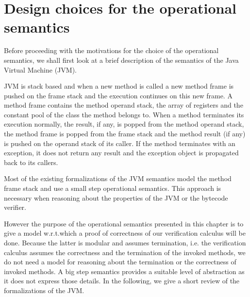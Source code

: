 
\section{Design choices for the operational semantics}\label{opSem:JVM}


 Before proceeding with the motivations for the choice of the operational semantics,
 we shall first look at a brief description of the semantics of the Java Virtual Machine (JVM).

 JVM is stack based and when a new method is called a new method frame is pushed on the frame stack and the execution continues on this new frame.
 A method frame contains the method operand stack, the array of registers and the constant pool of the class the method belongs to.
 When a method terminates its execution normally, the result, if any, is popped from the method operand stack, the method frame is
 popped from the frame stack and the method result (if any) is pushed on the operand stack
 of its caller. If the method terminates with an exception, it does not return any result and the exception object is propagated back to its callers.


 Most of the existing formalizations of the JVM semantics model the method frame stack and use a small step operational semantics. 
 This approach is necessary when reasoning about the properties of the JVM or the bytecode verifier. 

 However the purpose of the operational semantics presented in this chapter is to give
 a model w.r.t.which a proof of correctness of our verification calculus will be done. Because the latter
 is modular and assumes termination,
 i.e. the verification calculus assumes the correctness and the termination of the invoked methods,
 we do not need a model for reasoning about the termination or the correctness of invoked methods.
 A big step semantics provides a suitable level of abstraction as it does not express those details.
 In the following, we give a short review of the formalizations of the JVM.

 

 

